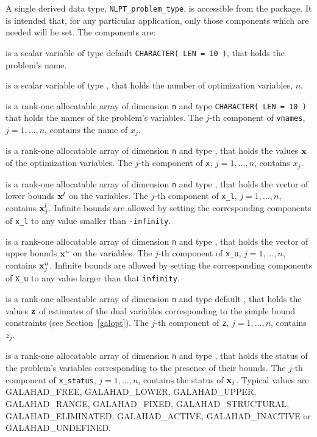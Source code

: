 \documentclass{galahad}
\newcommand{\packagename}{NLPT}
\newcommand{\sym}{\sf\small}
\begin{document}




\galtype
A single derived data type, {\tt \packagename\_problem\_type},
is accessible from the package. It is intended that, for any particular
application, only those components which are needed will be set.
The components are:

\begin{description}
 is a scalar variable of type default {\tt CHARACTER( LEN = 10 )},
that holds the problem's name.

 is a scalar variable of type \integer, 
 that holds the number of optimization variables, $n$.  

 is a rank-one allocatable array of dimension {\tt n} and type 
{\tt CHARACTER( LEN = 10 )} that holds the names of the problem's
variables. The $j$-th component of {\tt vnames}, $j = 1,  \ldots , n$, 
contains the name of $x_{j}$.  
              
 is a rank-one allocatable array of dimension {\tt n} and type 
\realdp, 
that holds the values ${\mathbf{x}}$ of the optimization variables.
The $j$-th component of {\tt x}, $j = 1,  \ldots , n$, contains $x_{j}$.  

 is a rank-one allocatable array of dimension {\tt n} and type 
\realdp, that holds
the vector of lower bounds ${\mathbf{x}}^{l}$ on the variables.
The $j$-th component of {\tt x\_l}, $j = 1, \ldots , n$, 
contains ${\mathbf{x}}_{j}^{l}$.
Infinite bounds are allowed by setting the corresponding 
components of {\tt x\_l} to any value smaller than {\tt -infinity}.

 is a rank-one allocatable array of dimension {\tt n} and type 
\realdp, that holds
the vector of upper bounds ${\mathbf{x}}^{u}$ on the variables.
The $j$-th component of {\tt x\_u}, $j = 1, \ldots , n$, 
contains ${\mathbf{x}}_{j}^{u}$.
Infinite bounds are allowed by setting the corresponding 
components of {\tt X\_u} to any value larger than that {\tt infinity}. 

 is a rank-one allocatable array of dimension {\tt n} and type default 
\realdp, that holds
the values ${\mathbf{z}}$ of estimates  of the dual variables 
corresponding to the simple bound constraints (see Section~\ref{galopt}).
The $j$-th component of {\tt z}, $j = 1,  \ldots ,  n$, contains $z_{j}$.  

 is  a rank-one allocatable array of dimension {\tt n} and type 
\integer, that holds the status of the problem's variables
corresponding to the presence of their bounds. The $j$-th component of 
{\tt x\_status}, $j = 1,  \ldots ,  n$, contains the status of ${\mathbf{x}}_j$.
Typical values are
{\sym GALAHAD\_FREE},  {\sym GALAHAD\_LOWER}, {\sym GALAHAD\_UPPER},
{\sym GALAHAD\_RANGE}, {\sym GALAHAD\_FIXED}, {\sym GALAHAD\_STRUCTURAL},
{\sym GALAHAD\_ELIMINATED}, {\sym GALAHAD\_ACTIVE}, 
{\sym GALAHAD\_INACTIVE} or {\sym GALAHAD\_UNDEFINED}.
        

\end{description}
\end{document}
